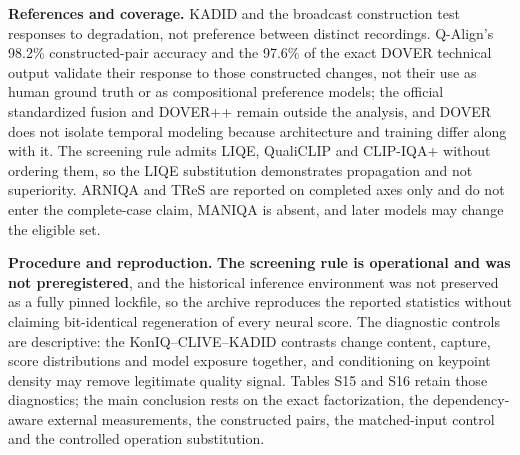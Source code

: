 \textbf{References and coverage.} KADID and the broadcast construction test responses to
degradation, not preference between distinct recordings. Q-Align's 98.2\% constructed-pair
accuracy and the 97.6\% of the exact DOVER technical output validate their response to
those constructed changes, not their use as human ground truth or as compositional
preference models; the official standardized fusion and DOVER++ remain outside the
analysis, and DOVER does not isolate temporal modeling because architecture and training
differ along with it. The screening rule admits LIQE, QualiCLIP and CLIP-IQA$+$ without
ordering them, so the LIQE substitution demonstrates propagation and not superiority.
ARNIQA and TReS are reported on completed axes only and do not enter the complete-case
claim, MANIQA is absent, and later models may change the eligible set.

\textbf{Procedure and reproduction.} \textbf{The screening rule is operational and was not
preregistered}, and the historical inference environment was not preserved as a fully
pinned lockfile, so the archive reproduces the reported statistics without claiming
bit-identical regeneration of every neural score. The diagnostic controls are descriptive:
the KonIQ--CLIVE--KADID contrasts change content, capture, score distributions and model
exposure together, and conditioning on keypoint density may remove legitimate quality
signal. Tables S15 and S16 retain those diagnostics; the main conclusion rests on the exact
factorization, the dependency-aware external measurements, the constructed pairs, the
matched-input control and the controlled operation substitution.
